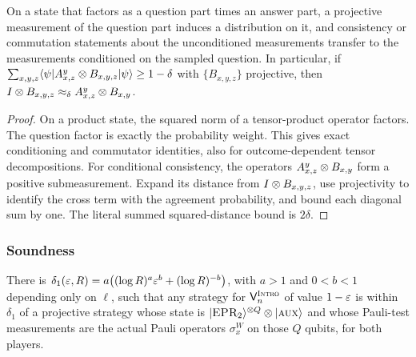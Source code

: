 \effortHard

\begin{lemma}
\label{lem:conditional-measurement}
\leanok
On a state that factors as a question part times an answer part, a projective measurement of
the question part induces a distribution on it, and consistency or commutation statements
about the unconditioned measurements transfer to the measurements conditioned on the sampled
question. In particular, if
$\sum_{x, y, z} \langle\psi| A^y_{x, z} \otimes B_{x, y, z} |\psi\rangle \geq 1 - \delta$ with
$\{B_{x,y,z}\}$ projective, then
$I \otimes B_{x, y, z} \approx_\delta A^y_{x, z} \otimes B_{x, y}$.
\end{lemma}
\begin{proof}
\leanok
On a product state, the squared norm of a tensor-product operator factors.
The question factor is exactly the probability weight. This gives exact
conditioning and commutator identities, also for outcome-dependent tensor
decompositions. For conditional consistency, the operators
$A^y_{x,z}\otimes B_{x,y}$ form a positive submeasurement. Expand its distance
from $I\otimes B_{x,y,z}$, use projectivity to identify the cross term with
the agreement probability, and bound each diagonal sum by one. The literal
summed squared-distance bound is $2\delta$.
\end{proof}

\subsubsection{Soundness}

\effortHard

\begin{lemma}
\label{lem:intro-pauli-extract}
There is $\delta_1(\varepsilon, R) = a\bigl( (\log R)^a \varepsilon^b + (\log R)^{-b} \bigr)$, with $a > 1$
and $0 < b < 1$ depending only on $\ell$, such that any strategy for $\mathsf{V}^{\textsc{Intro}}_n$ of value
$1 - \varepsilon$ is within $\delta_1$ of a projective strategy whose state is
$|\textsc{EPR}_2\rangle^{\otimes Q} \otimes |\textsc{aux}\rangle$ and whose Pauli-test measurements are the actual Pauli
operators $\sigma^W_x$ on those $Q$ qubits, for both players.
\end{lemma}

